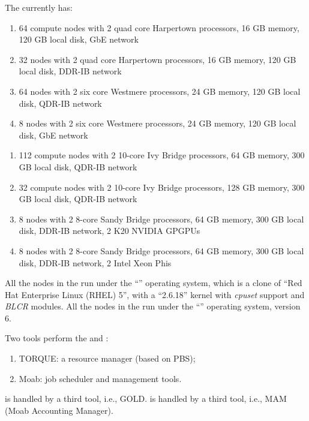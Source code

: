 The \hpc currently has:
\ifantwerpen
  \begin{enumerate}
    \item  64 compute nodes with 2 quad core Harpertown processors, 16 GB memory,
           120 GB local disk, GbE network
    \item  32 nodes with 2 quad core Harpertown processors, 16 GB memory,
           120 GB local disk, DDR-IB network
    \item  64 nodes with 2 six core Westmere processors, 24 GB memory,
           120 GB local disk, QDR-IB network
    \item  8 nodes with 2 six core Westmere processors, 24 GB memory,
           120 GB local disk, GbE network
  \end{enumerate}
\fi
\ifleuven
  \begin{enumerate}
    \item  112 compute nodes with 2 10-core Ivy Bridge processors, 64 GB memory,
           300 GB local disk, QDR-IB network
    \item  32 compute nodes with 2 10-core Ivy Bridge processors, 128 GB memory,
           300 GB local disk, QDR-IB network
    \item  8 nodes with 2 8-core Sandy Bridge processors, 64 GB memory,
           300 GB local disk, DDR-IB network, 2 K20 NVIDIA GPGPUs
    \item  8 nodes with 2 8-core Sandy Bridge processors, 64 GB memory,
           300 GB local disk, DDR-IB network, 2 Intel Xeon Phis
  \end{enumerate}
\fi

\ifantwerpen
All the nodes in the \hpc run under the ``\operatingsystem'' operating
system, which is a clone of ``Red Hat Enterprise Linux (RHEL) 5'', with a
``2.6.18'' kernel with \emph{cpuset} support and \emph{BLCR} modules.
\fi
\ifleuven
All the nodes in the \hpc run under the ``\operatingsystem'' operating system, version 6.
\fi

Two tools perform the  and :
\begin{enumerate}
  \item  TORQUE: a resource manager (based on PBS);
  \item  Moab: job scheduler and management tools.
\end{enumerate}
\ifantwerpen
{} is handled by a third tool, i.e., GOLD.
\fi
\ifleuven
{} is handled by a third tool, i.e., MAM (Moab Accounting Manager).
\fi

